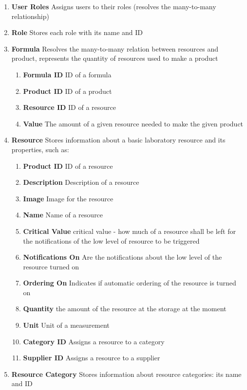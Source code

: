 \documentclass[a4paper,11pt,twoside]{report}
\theoremstyle{definition}
\begin{document}
\begin{enumerate}
\item \textbf{User Roles} Assigns users to their roles (resolves the many-to-many relationship)

\item \textbf{Role} Stores each role with its name and ID

\item \textbf{Formula} Resolves the many-to-many relation between resources and product, represents the quantity of resources used to make a product
\begin{enumerate}
\item \textbf{Formula ID} ID of a formula
\item \textbf{Product ID} ID of a product
\item \textbf{Resource ID} ID of a resource
\item \textbf{Value} The amount of a given resource needed to make the given product
\end{enumerate}

\item \textbf{Resource} Stores information about a basic laboratory resource and its properties, such as:
\begin{enumerate}
\item \textbf{Product ID} ID of a resource
\item \textbf{Description} Description of a resource
\item \textbf{Image} Image for the resource
\item \textbf{Name} Name of a resource
\item \textbf{Critical Value} critical value - how much of a resource shall be left for the notifications of the low level of resource to be triggered
\item \textbf{Notifications On} Are the notifications about the low level of the resource turned on
\item \textbf{Ordering On} Indicates if automatic ordering of the resource is turned on
\item \textbf{Quantity} the amount of the resource at the storage at the moment
\item \textbf{Unit} Unit of a measurement
\item \textbf{Category ID} Assigns a resource to a category
\item \textbf{Supplier ID} Assigns a resource to a supplier
\end{enumerate}

\item \textbf{Resource Category} Stores information about resource categories: its name and ID


\end{enumerate}
\end{document}
